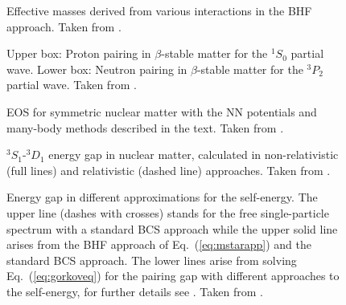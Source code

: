 \documentclass[rmp,preprint,aps,floatfix]{revtex4}
\begin{document}
\begin{figure}
\caption{Effective masses derived from various interactions in 
         the BHF approach. Taken from \cite{pair2}.\label{fig:mstar}}
\end{figure}


\begin{figure}
\begin{center}
      \caption{Upper box: Proton pairing in $\beta$-stable matter for 
          the $^1S_0$ partial wave. Lower box: Neutron pairing in 
          $\beta$-stable matter for the $^3P_2$
          partial wave. Taken from \cite{pair1}.}
     \label{fig:figgap}
\end{center}
\end{figure}

\begin{figure}
    \caption{EOS for symmetric nuclear matter with the NN potentials 
 and many-body methods described in the text. Taken from \cite{eeho98}.}
    \label{fig:figprc58_1}
\end{figure}

\begin{figure}
    \caption{$^3S_1$-$^3D_1$ energy gap in nuclear matter, calculated in 
  non-relativistic (full lines) and relativistic 
 (dashed line) approaches. Taken from \cite{eeho98}. }
    \label{fig:figprc58_2}
\end{figure} 

\begin{figure}
\caption{Energy gap in different approximations for the self-energy. 
The upper line (dashes with crosses)  
stands for the free single-particle spectrum with a standard BCS approach
while the upper solid line
arises from the BHF approach of Eq.~(\ref{eq:mstarapp})
and the standard BCS approach. The lower lines arise from solving 
Eq.~(\ref{eq:gorkoveq}) for the pairing gap with different 
approaches to the self-energy, for further details see \cite{lsz2001,ls2000}. Taken from \cite{lsz2001,ls2000}.
\label{fig:lombardo2001}}
\end{figure} 
\end{document}
